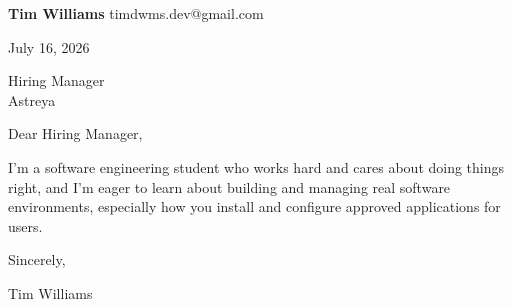 \documentclass[12pt]{article}
\begin{document}
\textbf{Tim Williams} \hfill timdwms.dev@gmail.com

\vspace{1em}

July 16, 2026

\vspace{1em}

Hiring Manager \\
Astreya

\vspace{1em}

Dear Hiring Manager,

I'm a software engineering student who works hard and cares about doing things right, and I'm eager to learn about building and managing real software environments, especially how you install and configure approved applications for users.

\vspace{1em}

Sincerely,

\vspace{2em}

Tim Williams
\end{document}
